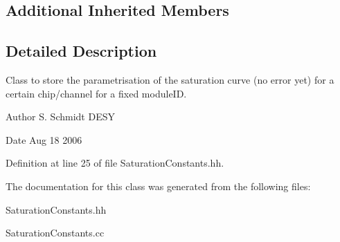 \subsection*{Additional Inherited Members}


\subsection{Detailed Description}
Class to store the parametrisation of the saturation curve (no error yet) for a certain chip/channel for a fixed module\-I\-D. 

\begin{DoxyAuthor}{Author}
S. Schmidt D\-E\-S\-Y 
\end{DoxyAuthor}
\begin{DoxyDate}{Date}
Aug 18 2006 
\end{DoxyDate}


Definition at line 25 of file Saturation\-Constants.\-hh.



The documentation for this class was generated from the following files\-:\begin{DoxyCompactItemize}
\item 
Saturation\-Constants.\-hh\item 
Saturation\-Constants.\-cc\end{DoxyCompactItemize}
